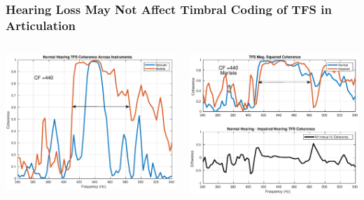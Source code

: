 \documentclass[aspectratio=1610]{beamer}
\begin{document}
\begin{frame}
\frametitle{Hearing Loss May Not Affect Timbral Coding of TFS in Articulation} 

\begin{columns}
\begin{column}{0.55\textwidth}
\includegraphics[scale = .4]{martele_spiccato_TFS_440}
\end{column}
\begin{column}{0.56\textwidth}
\includegraphics[scale = .4]{martele_TFS_diff_440}
\end{column}
\end{columns}

\end{frame}
\end{document}
